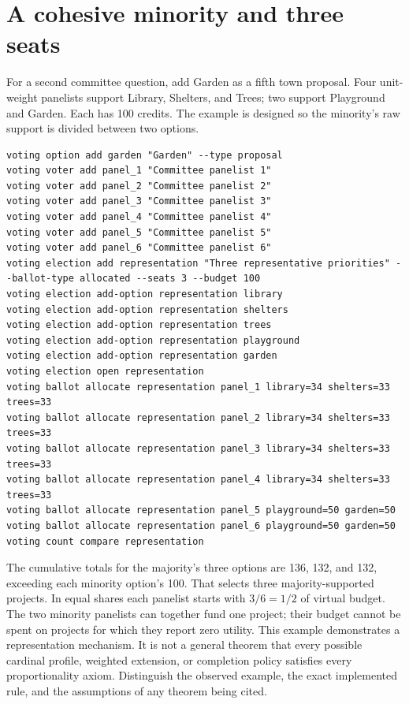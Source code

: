 \section{A cohesive minority and three seats}
For a second committee question, add Garden as a fifth town proposal. Four unit-weight panelists support Library, Shelters, and Trees; two support Playground and Garden. Each has 100 credits. The example is designed so the minority's raw support is divided between two options.
\begin{lstlisting}[style=votingrun]
voting option add garden "Garden" --type proposal
voting voter add panel_1 "Committee panelist 1"
voting voter add panel_2 "Committee panelist 2"
voting voter add panel_3 "Committee panelist 3"
voting voter add panel_4 "Committee panelist 4"
voting voter add panel_5 "Committee panelist 5"
voting voter add panel_6 "Committee panelist 6"
voting election add representation "Three representative priorities" --ballot-type allocated --seats 3 --budget 100
voting election add-option representation library
voting election add-option representation shelters
voting election add-option representation trees
voting election add-option representation playground
voting election add-option representation garden
voting election open representation
voting ballot allocate representation panel_1 library=34 shelters=33 trees=33
voting ballot allocate representation panel_2 library=34 shelters=33 trees=33
voting ballot allocate representation panel_3 library=34 shelters=33 trees=33
voting ballot allocate representation panel_4 library=34 shelters=33 trees=33
voting ballot allocate representation panel_5 playground=50 garden=50
voting ballot allocate representation panel_6 playground=50 garden=50
voting count compare representation
\end{lstlisting}
The cumulative totals for the majority's three options are 136, 132, and 132, exceeding each minority option's 100. That selects three majority-supported projects. In equal shares each panelist starts with $3/6=1/2$ of virtual budget. The two minority panelists can together fund one project; their budget cannot be spent on projects for which they report zero utility.
This example demonstrates a representation mechanism. It is not a general theorem that every possible cardinal profile, weighted extension, or completion policy satisfies every proportionality axiom. Distinguish the observed example, the exact implemented rule, and the assumptions of any theorem being cited.

